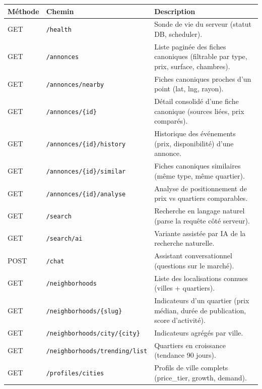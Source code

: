 \begin{table}[H]
    \centering
    \footnotesize
    \renewcommand{\arraystretch}{1.25}
    \begin{tabularx}{\textwidth}{|l|l|X|}
        \hline
        \rowcolor{headergray}
        \textbf{M\'ethode} & \textbf{Chemin} & \textbf{Description} \\ \hline
        GET  & \texttt{/health} & Sonde de vie du serveur (statut DB, scheduler). \\ \hline
        GET  & \texttt{/annonces} & Liste pagin\'ee des fiches canoniques (filtrable par type, prix, surface, chambres). \\ \hline
        GET  & \texttt{/annonces/nearby} & Fiches canoniques proches d'un point (lat, lng, rayon). \\ \hline
        GET  & \texttt{/annonces/\{id\}} & D\'etail consolid\'e d'une fiche canonique (sources li\'ees, prix compar\'es). \\ \hline
        GET  & \texttt{/annonces/\{id\}/history} & Historique des \'ev\'enements (prix, disponibilit\'e) d'une annonce. \\ \hline
        GET  & \texttt{/annonces/\{id\}/similar} & Fiches canoniques similaires (m\^eme type, m\^eme quartier). \\ \hline
        GET  & \texttt{/annonces/\{id\}/analyse} & Analyse de positionnement de prix vs quartiers comparables. \\ \hline
        GET  & \texttt{/search} & Recherche en langage naturel (parse la requ\^ete c\^ot\'e serveur). \\ \hline
        GET  & \texttt{/search/ai} & Variante assist\'ee par IA de la recherche naturelle. \\ \hline
        POST & \texttt{/chat} & Assistant conversationnel (questions sur le march\'e). \\ \hline
        GET  & \texttt{/neighborhoods} & Liste des localisations connues (villes + quartiers). \\ \hline
        GET  & \texttt{/neighborhoods/\{slug\}} & Indicateurs d'un quartier (prix m\'edian, dur\'ee de publication, score d'activit\'e). \\ \hline
        GET  & \texttt{/neighborhoods/city/\{city\}} & Indicateurs agr\'eg\'es par ville. \\ \hline
        GET  & \texttt{/neighborhoods/trending/list} & Quartiers en croissance (tendance 90 jours). \\ \hline
        GET  & \texttt{/profiles/cities} & Profils de ville complets (price\_tier, growth, demand). \\ \hline

\end{tabularx}
\end{table}
